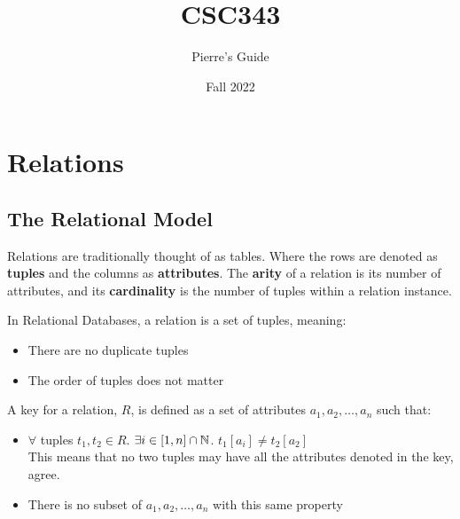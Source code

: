 \documentclass{report}
\title{\Huge{CSC343}}
\author{Pierre's Guide}
\date{\huge{Fall 2022}}
\begin{document}
    \maketitle
    \newpage
    \tableofcontents
    \pagebreak


    \chapter{Relations}
    \section{The Relational Model}

    \vspace{.5cm}

    \par Relations are traditionally thought of as tables. Where the rows are denoted as \textbf{tuples} and the columns as \textbf{attributes}. The \textbf{arity} of a relation is its number of attributes, and its \textbf{cardinality} is the number of tuples within a relation instance. \\
    
    \par In Relational Databases, a relation is a set of tuples, meaning: 
    \begin{itemize}
        \item There are no duplicate tuples
        \item The order of tuples does not matter
    \end{itemize} 
\vspace{.5cm}
 
    {
        A key for a relation, $R$, is defined as a set of attributes $a_1, a_2, \dots, a_n$ such that:
        \begin{itemize}
            \item $\forall$ tuples $t_1, t_2 \in R$. $\exists i \in [1,n]\cap \mathbb{N}$. $t_1 [a_i] \neq t_2 [a_2] $ \\
            This means that no two tuples may have all the attributes denoted in the key, agree. 

            \item There is no subset of $a_1, a_2, \dots, a_n$ with this same property
            
        \end{itemize}
    } \vspace{.5cm}
     
\end{document}
